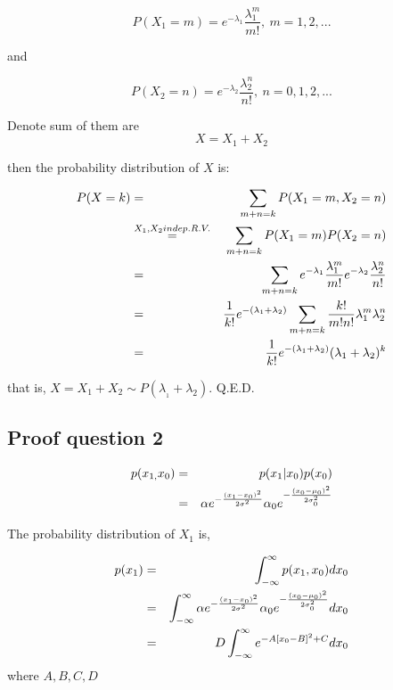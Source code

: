 \documentclass[english,11pt]{article}
\begin{document}
\begin{equation}
P(X_{1}=m)=e^{-\lambda_{1}}\frac{\lambda_{1}^{m}}{m!},\ m=1,2,...    
\end{equation}


and

\begin{equation}
P(X_{2}=n)=e^{-\lambda_{2}}\frac{\lambda_{2}^{n}}{n!},\ n=0,1,2,...    
\end{equation}


Denote sum of them are 
\begin{equation}
X=X_{1}+X_{2}
\end{equation}

then the probability distribution of $X$ is:

\begin{eqnarray}
P(X=k) & = & \sum_{m+n=k}P(X_{1}=m,X_{2}=n) \notag \\
 & \overset{X_{1},X_{2}indep.R.V.}{=} & \sum_{m+n=k}P(X_{1}=m)P(X_{2}=n) \notag \\
 & = & \sum_{m+n=k}e^{-\lambda_{1}}\frac{\lambda_{1}^{m}}{m!}e^{-\lambda_{2}}\frac{\lambda_{2}^{n}}{n!} \notag \\
 & = & \frac{1}{k!}e^{-(\lambda_{1}+\lambda_{2})}\sum_{m+n=k}\frac{k!}{m!n!}\lambda_{1}^{m}\lambda_{2}^{n} \notag \\
 & = & \frac{1}{k!}e^{-(\lambda_{1}+\lambda_{2})}(\lambda_{1}+\lambda_{2})^{k}
\end{eqnarray}

that is, $X=X_{1}+X_{2}\sim P(\lambda_{_{1}}+\lambda_{2})$. Q.E.D.

\subsection{Proof question 2}

\begin{eqnarray}
p(x_{1,}x_{0}) & = & p(x_{1}|x_{0})p(x_{0}) \notag \\
 & = & \alpha e^{-\frac{(x_{1}-x_{0})^{2}}{2\sigma^{2}}}\alpha_{0}e^{-\frac{(x_{0}-\mu_{0})^{2}}{2\sigma_{0}^{2}}}
\end{eqnarray}

The probability distribution of $X_{1}$ is,

\begin{eqnarray}
p(x_{1}) & = & \int_{-\infty}^{\infty}p(x_{1},x_{0})dx_{0} \notag \\
 & = & \int_{-\infty}^{\infty}\alpha e^{-\frac{(x_{1}-x_{0})^{2}}{2\sigma^{2}}}\alpha_{0}e^{-\frac{(x_{0}-\mu_{0})^{2}}{2\sigma_{0}^{2}}}dx_{0} \notag \\
 & = & D\int_{-\infty}^{\infty}e^{-A[x_{0}-B]^{2}+C}dx_{0}
 \label{eqn:px1}
\end{eqnarray}
where $A,B,C,D$
\end{document}

